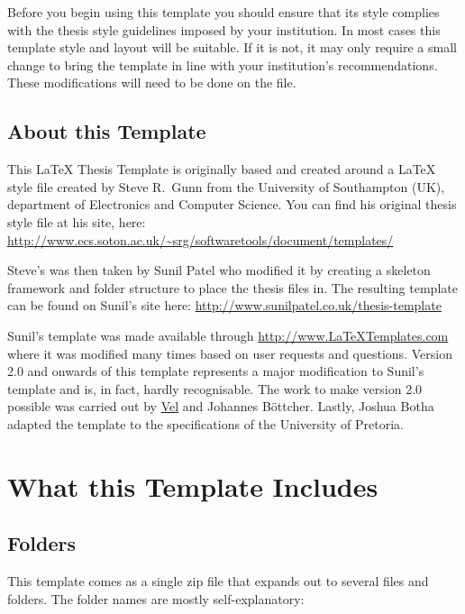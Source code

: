 Before you begin using this template you should ensure that its style complies with the thesis style guidelines imposed by your institution.
In most cases this template style and layout will be suitable. If it is not, it may only require a small change to bring the template in line with your institution's recommendations.
These modifications will need to be done on the  file.

\subsection{About this Template}

This \LaTeX{} Thesis Template is originally based and created around a \LaTeX{} style file created by Steve R.\ Gunn from the University of Southampton (UK), department of Electronics and Computer Science.
You can find his original thesis style file at his site, here:
\url{http://www.ecs.soton.ac.uk/~srg/softwaretools/document/templates/}

Steve's  was then taken by Sunil Patel who modified it by creating a skeleton framework and folder structure to place the thesis files in.
The resulting template can be found on Sunil's site here: \url{http://www.sunilpatel.co.uk/thesis-template}

Sunil's template was made available through \url{http://www.LaTeXTemplates.com} where it was modified many times based on user requests and questions.
Version 2.0 and onwards of this template represents a major modification to Sunil's template and is, in fact, hardly recognisable.
The work to make version 2.0 possible was carried out by \href{mailto:vel@latextemplates.com}{Vel} and Johannes Böttcher.
Lastly, Joshua Botha adapted the template to the specifications of the University of Pretoria.

\section{What this Template Includes}

\subsection{Folders}

This template comes as a single zip file that expands out to several files and folders.
The folder names are mostly self-explanatory:

